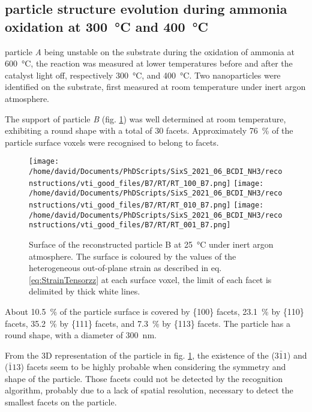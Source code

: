 \subsection{particle structure evolution during ammonia oxidation at \qty{300}{\degreeCelsius} and \qty{400}{\degreeCelsius}}\label{sec:BCDIAmmoniaOxidation}

particle \textit{A} being unstable on the substrate during the oxidation of ammonia at \qty{600}{\degreeCelsius}, the reaction was measured at lower temperatures before and after the catalyst light off, respectively \qty{300}{\degreeCelsius}, and \qty{400}{\degreeCelsius}.
Two nanoparticles were identified on the substrate, first measured at room temperature under inert argon atmosphere.

The support of particle \textit{B} (fig. \ref{fig:B7Facets}) was well determined at room temperature, exhibiting a round shape with a total of 30 facets.
Approximately \qty{76}{\percent} of the particle surface voxels were recognised to belong to facets.

\begin{figure}[!htb]
    \centering
    \texttt{[image: /home/david/Documents/PhDScripts/SixS\_2021\_06\_BCDI\_NH3/reconstructions/vti\_good\_files/B7/RT/RT\_100\_B7.png]}
    \texttt{[image: /home/david/Documents/PhDScripts/SixS\_2021\_06\_BCDI\_NH3/reconstructions/vti\_good\_files/B7/RT/RT\_010\_B7.png]}
    \texttt{[image: /home/david/Documents/PhDScripts/SixS\_2021\_06\_BCDI\_NH3/reconstructions/vti\_good\_files/B7/RT/RT\_001\_B7.png]}
    \caption{
        Surface of the reconstructed particle B at \qty{25}{\degreeCelsius} under inert argon atmosphere.
        The surface is coloured by the values of the heterogeneous out-of-plane strain as described in eq. \ref{eq:StrainTensorzz} at each surface voxel, the limit of each facet is delimited by thick white lines.
    }
    \label{fig:B7Facets}
\end{figure}

About \qty{10.5}{\percent} of the particle surface is covered by \{100\} facets, \qty{23.1}{\percent} by \{110\} facets, \qty{35.2}{\percent} by \{111\} facets, and \qty{7.3}{\percent} by \{113\} facets.
The particle has a round shape, with a diameter of \qty{300}{\nm}.

From the 3D representation of the particle in fig. \ref{fig:B7Facets}, the existence of the ($3\bar{1}1$) and ($\bar{1}13$) facets seem to be highly probable when considering the symmetry and shape of the particle.
Those facets could not be detected by the recognition algorithm, probably due to a lack of spatial resolution, necessary to detect the smallest facets on the particle.

